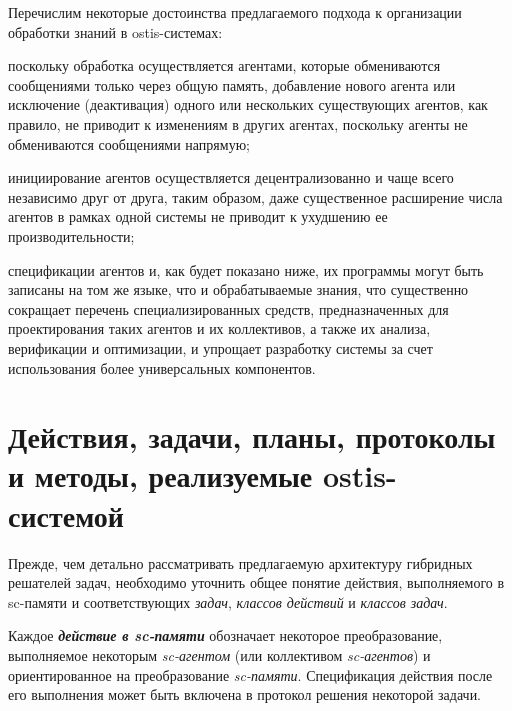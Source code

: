 Перечислим некоторые достоинства предлагаемого подхода к организации обработки знаний в ostis-системах:
\begin{textitemize}
	\item поскольку обработка осуществляется агентами, которые обмениваются сообщениями только через общую память, добавление нового агента или исключение (деактивация) одного или нескольких существующих агентов, как правило, не приводит к изменениям в других агентах, поскольку агенты не обмениваются сообщениями напрямую;
	\item инициирование агентов осуществляется децентрализованно и чаще всего независимо друг от друга, таким образом, даже существенное расширение числа агентов в рамках одной системы не приводит к ухудшению ее производительности;
	\item спецификации агентов и, как будет показано ниже, их программы могут быть записаны на том же языке, что и обрабатываемые знания, что существенно сокращает перечень специализированных средств, предназначенных для проектирования таких агентов и их коллективов, а также их анализа, верификации и оптимизации, и упрощает разработку системы за счет использования более универсальных компонентов.
\end{textitemize}

\section{Действия, задачи, планы, протоколы и методы, реализуемые ostis-системой}
\label{sec_ps_actions}

Прежде, чем детально рассматривать предлагаемую архитектуру гибридных решателей задач, необходимо уточнить общее понятие действия, выполняемого в sc-памяти и соответствующих \textit{задач}, \textit{классов действий} и \textit{классов задач}.

\begin{SCn}
\end{SCn}

Каждое \textbf{\textit{действие в sc-памяти}} обозначает некоторое преобразование, выполняемое некоторым \textit{sc-агентом} (или коллективом \textit{sc-агентов}) и ориентированное на преобразование \textit{sc-памяти}. Спецификация действия после его выполнения может быть включена в протокол решения некоторой задачи. 
	
